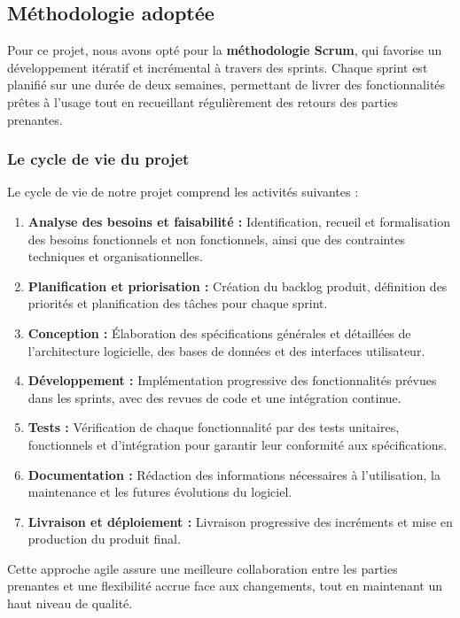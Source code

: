 \subsection{Méthodologie adoptée}

Pour ce projet, nous avons opté pour la \textbf{méthodologie Scrum}, qui favorise un développement itératif et incrémental à travers des sprints. Chaque sprint est planifié sur une durée de deux semaines, permettant de livrer des fonctionnalités prêtes à l'usage tout en recueillant régulièrement des retours des parties prenantes.

\subsubsection{Le cycle de vie du projet}

Le cycle de vie de notre projet comprend les activités suivantes :

\begin{enumerate}
    \item \textbf{Analyse des besoins et faisabilité :} Identification, recueil et formalisation des besoins fonctionnels et non fonctionnels, ainsi que des contraintes techniques et organisationnelles.
    \item \textbf{Planification et priorisation :} Création du backlog produit, définition des priorités et planification des tâches pour chaque sprint.
    \item \textbf{Conception :} Élaboration des spécifications générales et détaillées de l'architecture logicielle, des bases de données et des interfaces utilisateur.
    \item \textbf{Développement :} Implémentation progressive des fonctionnalités prévues dans les sprints, avec des revues de code et une intégration continue.
    \item \textbf{Tests :} Vérification de chaque fonctionnalité par des tests unitaires, fonctionnels et d'intégration pour garantir leur conformité aux spécifications.
    \item \textbf{Documentation :} Rédaction des informations nécessaires à l'utilisation, la maintenance et les futures évolutions du logiciel.
    \item \textbf{Livraison et déploiement :} Livraison progressive des incréments et mise en production du produit final.
\end{enumerate}

Cette approche agile assure une meilleure collaboration entre les parties prenantes et une flexibilité accrue face aux changements, tout en maintenant un haut niveau de qualité.

